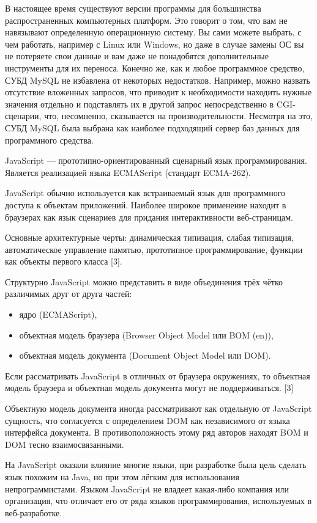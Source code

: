В настоящее время существуют версии программы для большинства распространенных компьютерных платформ. Это говорит о том, что вам не навязывают определенную операционную систему. Вы сами можете выбрать, с чем работать, например с Linux или Windows, но даже в случае замены ОС вы не потеряете свои данные и вам даже не понадобятся дополнительные инструменты для их переноса.
Конечно же, как и любое программное средство, СУБД MySQL не избавлена от некоторых недостатков. Например, можно назвать отсутствие вложенных запросов, что приводит к необходимости находить нужные значения отдельно и подставлять их в другой запрос непосредственно в CGI-сценарии, что, несомненно, сказывается на производительности.
Несмотря на это, СУБД MySQL была выбрана как наиболее подходящий сервер баз данных для программного средства.

JavaScript — прототипно-ориентированный сценарный язык программирования. Является реализацией языка ECMAScript (стандарт ECMA-262).

JavaScript обычно используется как встраиваемый язык для программного доступа к объектам приложений. Наиболее широкое применение находит в браузерах как язык сценариев для придания интерактивности веб-страницам.

Основные архитектурные черты: динамическая типизация, слабая типизация, автоматическое управление памятью, прототипное программирование, функции как объекты первого класса [3].

Структурно JavaScript можно представить в виде объединения трёх чётко различимых друг от друга частей:

\begin{itemize}
	\item ядро (ECMAScript),
	\item объектная модель браузера (Browser Object Model или BOM (en)),
	\item объектная модель документа (Document Object Model или DOM).
\end{itemize}

Если рассматривать JavaScript в отличных от браузера окружениях, то объектная модель браузера и объектная модель документа могут не поддерживаться. [3]

Объектную модель документа иногда рассматривают как отдельную от JavaScript сущность, что согласуется с определением DOM как независимого от языка интерфейса документа. В противоположность этому ряд авторов находят BOM и DOM тесно взаимосвязанными.

На JavaScript оказали влияние многие языки, при разработке была цель сделать язык похожим на Java, но при этом лёгким для использования непрограммистами. Языком JavaScript не владеет какая-либо компания или организация, что отличает его от ряда языков программирования, используемых в веб-разработке.

